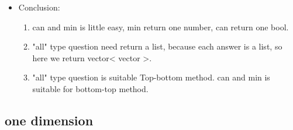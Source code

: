 \documentclass[a4paper,11pt,twoside]{book}
\begin{document}
\begin{itemize}
	\item Conclusion:
	\begin{enumerate}
		\item can and min is little easy, min return one number, can return one bool. 
		\item "all" type question need return a list, because each answer is a list, so here we return vector< vector >. 
		\item "all" type question is suitable Top-bottom method. can and min is suitable for bottom-top method.
	\end{enumerate}
	
\end{itemize}


\subsection{one dimension}
\end{document}
